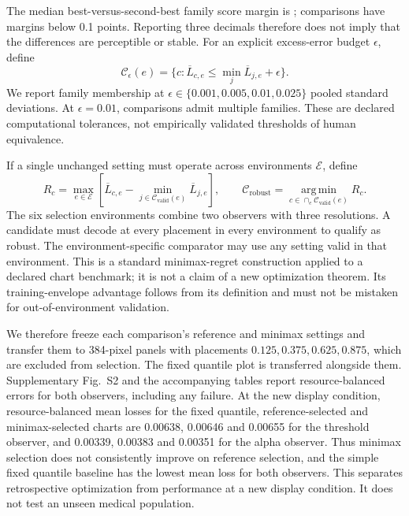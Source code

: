 \documentclass[11pt]{article}
\begin{document}
The median best-versus-second-best family score margin is \MarginMedian{}; \SmallMargins{} comparisons have margins below 0.1 points. Reporting three decimals therefore does not imply that the differences are perceptible or stable. For an explicit excess-error budget $\epsilon$, define
\begin{equation}
\mathcal C_\epsilon(e)=\{c:\overline L_{c,e}\leq\min_j\overline L_{j,e}+\epsilon\}.
\end{equation}
We report family membership at $\epsilon\in\{0.001,0.005,0.01,0.025\}$ pooled standard deviations. At $\epsilon=0.01$, \NearCount{} comparisons admit multiple families. These are declared computational tolerances, not empirically validated thresholds of human equivalence.

If a single unchanged setting must operate across environments $\mathcal E$, define
\begin{equation}
R_c=\max_{e\in\mathcal E}\left[\overline L_{c,e}-\min_{j\in\mathcal C_{\mathrm{valid}}(e)}\overline L_{j,e}\right],
\qquad\mathcal C_{\mathrm{robust}}=\operatorname*{arg\,min}_{c\in\cap_e\mathcal C_{\mathrm{valid}}(e)}R_c.
\label{eq:regret}
\end{equation}
The six selection environments combine two observers with three resolutions. A candidate must decode at every placement in every environment to qualify as robust. The environment-specific comparator may use any setting valid in that environment. This is a standard minimax-regret construction applied to a declared chart benchmark; it is not a claim of a new optimization theorem. Its training-envelope advantage follows from its definition and must not be mistaken for out-of-environment validation.

We therefore freeze each comparison's reference and minimax settings and transfer them to 384-pixel panels with placements $0.125,0.375,0.625,0.875$, which are excluded from selection. The fixed quantile plot is transferred alongside them. Supplementary Fig.~S2 and the accompanying tables report resource-balanced errors for both observers, including any failure. At the new display condition, resource-balanced mean losses for the fixed quantile, reference-selected and minimax-selected charts are 0.00638, 0.00646 and 0.00655 for the threshold observer, and 0.00339, 0.00383 and 0.00351 for the alpha observer. Thus minimax selection does not consistently improve on reference selection, and the simple fixed quantile baseline has the lowest mean loss for both observers. This separates retrospective optimization from performance at a new display condition. It does not test an unseen medical population.
\end{document}
